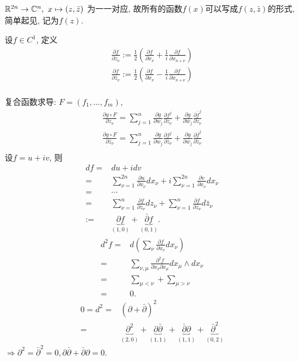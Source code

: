 ${\mathbb R}^{2n} \to {\mathbb C}^n ,~
x \mapsto (z,\bar{z}) $ 为一一对应, 故所有的函数$f(x)$可以写成$f(z,\bar{z}) $的形式, 简单起见, 记为$f(z)$.
\begin{definition}
  设$f \in C^1$, 定义
  \begin{align*}
    \frac{\partial f}{\partial z_\nu }:=\frac{1}{2}(\frac{\partial f}{\partial x_\nu }  +\frac{1}{i}\frac{\partial f}{\partial x_{n+\nu }} ) \\
    \frac{\partial f}{\partial \bar z_\nu }:=\frac{1}{2}(\frac{\partial f}{\partial x_\nu }  -\frac{1}{i}\frac{\partial f}{\partial x_{n+\nu }} )  \\
  \end{align*} 
\end{definition}
复合函数求导: $F=(f_1,\dots,f_m)$,
\begin{align*}
  \frac{\partial g \circ F}{\partial z_\nu }=\sum_{j =1}^{n}\frac{\partial g}{\partial w_j} \frac{\partial f^j}{\partial z_\nu } +\frac{\partial g}{\partial \bar w_j} \frac{\partial \bar f^j}{\partial z_\nu }  \\
  \frac{\partial g \circ F}{\partial \bar z_\nu }=\sum_{j =1}^{n}\frac{\partial g}{\partial w_j} \frac{\partial f^j}{\partial \bar z_\nu } +\frac{\partial g}{\partial \bar w_j} \frac{\partial \bar f^j}{\partial \bar z_\nu } \\
\end{align*} 
设$f=u+iv$, 则
\begin{align*}
  df=& du+idv\\
  =& \sum_{\nu =1}^{2n} \frac{\partial u}{\partial x_\nu }dx_\nu +i \sum_{\nu =1}^{2n}\frac{\partial v}{\partial x_{\nu }}dx_\nu   \\
  =& \cdots\\
  =& \sum_{\nu =1}^{n} \frac{\partial f}{\partial z_\nu }dz_\nu + \sum_{\nu =1}^{n}\frac{\partial f}{\partial \bar z_{\nu }}d\bar z_\nu \\
  := &\underbrace{\partial f}_{(1,0)}  + \underbrace{\bar \partial f}_{(0,1)}.
\end{align*} 
\begin{align*}
  d^2f=& d(\sum_{\nu }\frac{\partial f}{\partial x_\nu } dx_\nu )\\
  =& \sum_{\nu ,\mu } \frac{\partial^2 f }{\partial x_\nu  \partial x_\mu } dx_\mu \wedge dx_\nu \\
  =& \sum_{\mu <\nu } +\sum_{\mu >\nu }\\
  =&0.
\end{align*} 
\begin{equation*}
  \begin{aligned}
    0=d^2=&(\partial+\bar{\partial})^2\\
    =& \underbrace{\partial^2}_{(2,0)} +\underbrace{\partial \bar \partial}_{(1,1)}+ \underbrace{\bar \partial \partial}_{(1,1)} +\underbrace{\bar{\partial}^2}_{(0,2)}
  \end{aligned} 
\end{equation*}
$\Rightarrow \partial^2=\bar{\partial}^2=0,\partial \bar \partial+\bar \partial \partial=0.$ 

